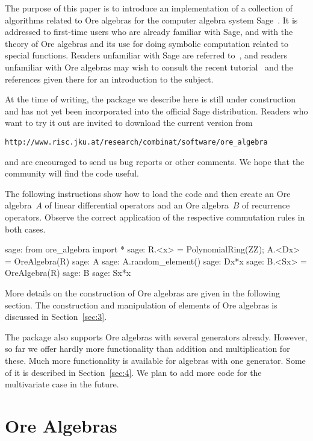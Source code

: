 \documentclass{llncs}
\begin{document}
The purpose of this paper is to introduce an implementation of a collection of
algorithms related to Ore algebras for the computer algebra system
Sage~\cite{sage}. It is addressed to first-time users who are already familiar
with Sage, and with the theory of Ore algebras and its use for doing symbolic
computation related to special functions. Readers unfamiliar with Sage are referred
to~\cite{sage}, and readers unfamiliar with Ore algebras may wish to consult the
recent tutorial~\cite{kauers13} and the references given there for an introduction to
the subject.

At the time of writing, the package we describe here is still under construction
and has not yet been incorporated into the official Sage distribution. Readers
who want to try it out are invited to download the current version from 
\begin{center}
  \verb|http://www.risc.jku.at/research/combinat/software/ore_algebra|
\end{center}
and are encouraged to send us bug reports or other comments. We hope 
that the community will find the code useful.

The following instructions show how to load the code and then create an Ore
algebra~$A$ of linear differential operators and an Ore algebra~$B$ of
recurrence operators. Observe the correct application of the respective
commutation rules in both cases.

\begin{sageexample}
  sage: from ore_algebra import *
  sage: R.<x> = PolynomialRing(ZZ); A.<Dx> = OreAlgebra(R)
  sage: A
  sage: A.random_element()
  sage: Dx*x
  sage: B.<Sx> = OreAlgebra(R)
  sage: B
  sage: Sx*x
\end{sageexample}

More details on the construction of Ore algebras are given in the following
section. The construction and manipulation of elements of Ore algebras is
discussed in Section~\ref{sec:3}.

The package also supports Ore algebras with several generators already. However,
so far we offer hardly more functionality than addition and multiplication for
these. Much more functionality is available for algebras with one generator. 
Some of it is described in Section~\ref{sec:4}. We plan to add more code for the
multivariate case in the future.

\section{Ore Algebras}
\end{document}
